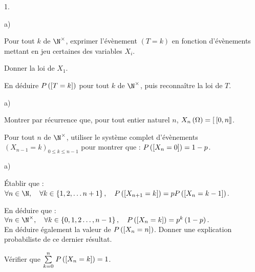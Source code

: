 \documentclass[11pt]{article}%
\begin{document}
\begin{noliste}{1.}
 \setlength{\itemsep}{4mm}
\item 

\begin{noliste}{a)}
 \setlength{\itemsep}{2mm}
\item Pour tout $k$ de $\N^{\times }$, exprimer l'évènement $\left(
T = k\right) $ en fonction d'évènements mettant en jeu certaines des
variables 
$X_{i}$.

\item Donner la loi de $X_{1}$.

\item En déduire $P\left(\left[ { T = k} \right]\right) $ pour tout $k$ de
$\N^{\times }
$, puis reconnaître la loi de $T$.
\end{noliste}

\item 

\begin{noliste}{a)}
 \setlength{\itemsep}{2mm}
\item Montrer par récurrence que, pour tout entier naturel $n$,
$X_{n}\left(
\Omega \right) = [ \ \hspace{-0.15em}[0,n]\hspace{-0.13em}]$.

\item Pour tout $n$ de $\N^{\times }$, utiliser le système complet
d'évènements $\left( X_{n-1} = k\right)_{0\leq k\leq n-1}$ pour montrer
que : $P\left(\left[ { X_{n} = 0} \right]\right) = 1-p$.
\end{noliste}

\item 

\begin{noliste}{a)}
 \setlength{\itemsep}{2mm}
\item Établir que : $\forall n\in \N,\quad \forall k\in \left\{
1,2,\dots n + 1\right\},\quad P\left(\Ev{ X_{n + 1} = k}\right) =
pP\left(\Ev{
X_{n} = k-1}\right) $.

\item En déduire que : $\forall n\in \N^{\times },\quad \forall k\in
\left\{ 0,1,2\dots,n-1\right\},\quad P\left(\Ev{ X_{n} = k}\right) =
p^{k}\left(
1-p\right).$\\
En déduire également la valeur de $P\left(\left[ { X_{n} = n} \right]\right) $.
Donner une
explication probabiliste de ce dernier résultat.

\item Vérifier que ${\textstyle\sum\limits_{k = 0}^{n}}\hspace{.1cm}P\left(\left[ { X_{n} = k} \right]\right) = 1$.
\end{noliste}


\end{noliste}
\end{document}
